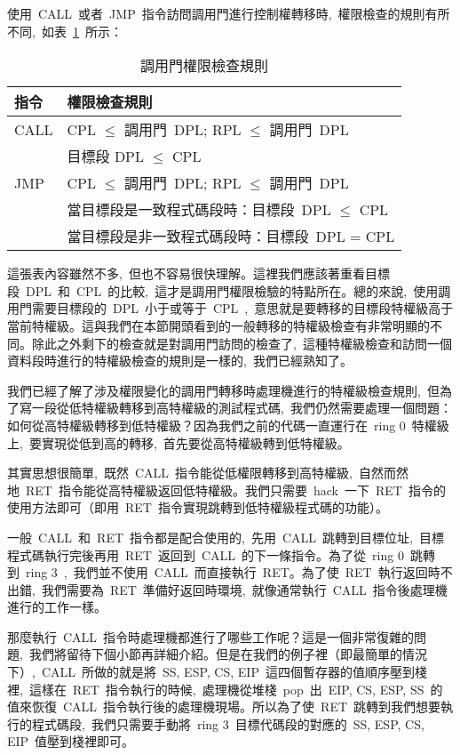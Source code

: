 使用~CALL~或者~JMP~指令訪問調用門進行控制權轉移時,~權限檢查的規則有所不同,~如表~\ref{callgate_rules}~所示：

\begin{center}\begin{longtable}{|l|l|}
\caption[]{調用門權限檢查規則}\label{callgate_rules}\\
\hline
\textbf{指令} & \textbf{權限檢查規則}\\
\hline
CALL & CPL $\le$ 調用門~DPL; RPL $\le$ 調用門~DPL\\
     & 目標段 DPL $\le$ CPL\\
\hline
JMP  & CPL $\le$ 調用門~DPL; RPL $\le$ 調用門~DPL\\
     & 當目標段是一致程式碼段時：目標段~DPL $\le$ CPL\\
     & 當目標段是非一致程式碼段時：目標段~DPL = CPL\\
\hline
\end{longtable}\end{center}

這張表內容雖然不多,~但也不容易很快理解。這裡我們應該著重看目標段~DPL~和~CPL~的比較,~這才是調用門權限檢驗的特點所在。總的來說,~使用調用門需要目標段的~DPL~小于或等于~CPL~,~意思就是要轉移的目標段特權級高于當前特權級。這與我們在本節開頭看到的一般轉移的特權級檢查有非常明顯的不同。除此之外剩下的檢查就是對調用門訪問的檢查了,~這種特權級檢查和訪問一個資料段時進行的特權級檢查的規則是一樣的,~我們已經熟知了。

我們已經了解了涉及權限變化的調用門轉移時處理機進行的特權級檢查規則,~但為了寫一段從低特權級轉移到高特權級的測試程式碼,~我們仍然需要處理一個問題：如何從高特權級轉移到低特權級？因為我們之前的代碼一直運行在~ring 0~特權級上,~要實現從低到高的轉移,~首先要從高特權級轉到低特權級。

其實思想很簡單,~既然~CALL~指令能從低權限轉移到高特權級,~自然而然地~RET~指令能從高特權級返回低特權級。我們只需要~hack~一下~RET~指令的使用方法即可（即用~RET~指令實現跳轉到低特權級程式碼的功能）。

一般~CALL~和~RET~指令都是配合使用的,~先用~CALL~跳轉到目標位址,~目標程式碼執行完後再用~RET~返回到~CALL~的下一條指令。為了從~ring 0~跳轉到~ring 3~,~我們並不使用~CALL~而直接執行~RET。為了使~RET~執行返回時不出錯,~我們需要為~RET~準備好返回時環境,~就像通常執行~CALL~指令後處理機進行的工作一樣。

那麼執行~CALL~指令時處理機都進行了哪些工作呢？這是一個非常復雜的問題,~我們將留待下個小節再詳細介紹。但是在我們的例子裡（即最簡單的情況下）,~CALL~所做的就是將~SS, ESP, CS, EIP~這四個暫存器的值順序壓到棧裡,~這樣在~RET~指令執行的時候,~處理機從堆棧~pop~出~EIP, CS, ESP, SS~的值來恢復~CALL~指令執行後的處理機現場。所以為了使~RET~跳轉到我們想要執行的程式碼段,~我們只需要手動將~ring 3~目標代碼段的對應的~SS, ESP, CS, EIP~值壓到棧裡即可。

